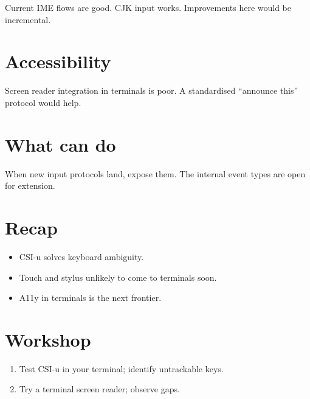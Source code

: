 Current IME flows are good. CJK input works. Improvements
here would be incremental.

\section{Accessibility}

Screen reader integration in terminals is poor. A
standardised ``announce this'' protocol would help.

\section{What \maya{} can do}

When new input protocols land, expose them. The internal
event types are open for extension.

\section{Recap}

\begin{recap}
\begin{itemize}[leftmargin=*]
  \item CSI-u solves keyboard ambiguity.
  \item Touch and stylus unlikely to come to terminals
    soon.
  \item A11y in terminals is the next frontier.
\end{itemize}
\end{recap}

\section*{Workshop}

\begin{enumerate}[leftmargin=*]
  \item Test CSI-u in your terminal; identify
    untrackable keys.
  \item Try a terminal screen reader; observe gaps.
\end{enumerate}
